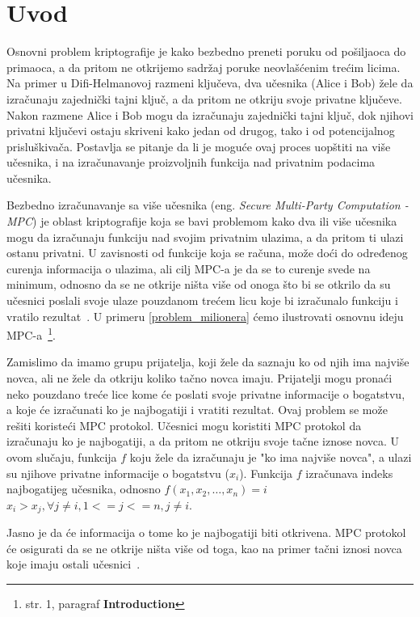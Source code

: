 
\section{Uvod}

Osnovni problem kriptografije je kako bezbedno preneti poruku od pošiljaoca do primaoca, a da pritom ne otkrijemo sadržaj poruke neovlašćenim trećim licima. Na primer u Difi-Helmanovoj razmeni ključeva, dva učesnika (Alice i Bob) žele da izračunaju zajednički tajni ključ, a da pritom ne otkriju svoje privatne ključeve. Nakon razmene Alice i Bob mogu da izračunaju zajednički tajni ključ, dok njihovi privatni ključevi ostaju skriveni kako jedan od drugog, tako i od potencijalnog prisluškivača. Postavlja se pitanje da li je moguće ovaj proces uopštiti na više učesnika, i na izračunavanje proizvoljnih funkcija nad privatnim podacima učesnika. 

Bezbedno izračunavanje sa više učesnika (eng. \textit{Secure Multi-Party Computation - MPC}) je oblast kriptografije koja se bavi problemom kako dva ili više učesnika mogu da izračunaju funkciju nad svojim privatnim ulazima, a da pritom ti ulazi ostanu privatni. U zavisnosti od funkcije koja se računa, može doći do određenog curenja informacija o ulazima, ali cilj MPC-a je da se to curenje svede na minimum, odnosno da se ne otkrije ništa više od onoga što bi se otkrilo da su učesnici poslali svoje ulaze pouzdanom trećem licu koje bi izračunalo funkciju i vratilo rezultat~\cite{smart2016cryptography}. U primeru \ref{problem_milionera} ćemo ilustrovati osnovnu ideju MPC-a~\cite{yao1982protocols}\footnote{str. 1, paragraf \textbf{Introduction}}.

\begin{example}
\label{problem_milionera}

Zamislimo da imamo grupu prijatelja, koji žele da saznaju ko od njih ima najviše novca, ali ne žele da otkriju koliko tačno novca imaju. 
Prijatelji mogu pronaći neko pouzdano treće lice kome će poslati svoje privatne informacije o bogatstvu, a koje će izračunati ko je najbogatiji i vratiti rezultat. 
Ovaj problem se može rešiti koristeći MPC protokol. Učesnici mogu koristiti MPC protokol da izračunaju ko je najbogatiji, a da pritom ne otkriju svoje tačne iznose novca. U ovom slučaju, funkcija $f$ koju žele da izračunaju je "ko ima najviše novca", a ulazi su njihove privatne informacije o bogatstvu ($x_i$). Funkcija $f$ izračunava indeks najbogatijeg učesnika, odnosno $f(x_1, x_2, \ldots, x_n) = i$  $x_i > x_j, \forall j \neq i, 1<=j<=n, j \neq i$.

Jasno je da će informacija o tome ko je najbogatiji biti otkrivena. MPC protokol će osigurati da se ne otkrije ništa više od toga, kao na primer tačni iznosi novca koje imaju ostali učesnici~\cite{smart2016cryptography}.

\end{example}

